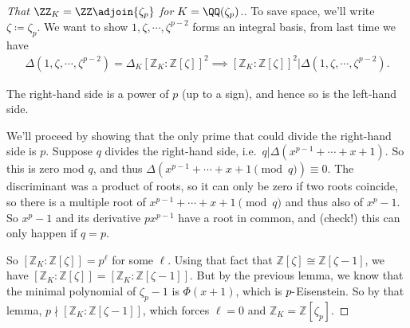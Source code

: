 \begin{proof}[That $\ZZ_K = \ZZ\adjoin{\zeta_p}$ for $K = \QQ(\zeta_p)$.]

To save space, we'll write \(\zeta \coloneqq\zeta_p\). We want to show
\(1, \zeta, \cdots, \zeta^{p-2}\) forms an integral basis, from last
time we have
\begin{align*}
{\Delta}( 1, \zeta, \cdots, \zeta^{p-2}) = 
{\Delta}_K 
[{\mathbb{Z}}_K : {\mathbb{Z}}[ \zeta ] ]^2 
\implies
[{\mathbb{Z}}_K : {\mathbb{Z}}[ \zeta ] ]^2 
\mathrel{\Big|}
{\Delta}( 1, \zeta, \cdots, \zeta^{p-2}) 
.\end{align*}

\begin{claim}

The right-hand side is a power of \(p\) (up to a sign), and hence so is
the left-hand side.

\end{claim}

We'll proceed by showing that the only prime that could divide the
right-hand side is \(p\). Suppose \(q\) divides the right-hand side,
i.e.~\(q \mathrel{\Big|}{\Delta}(x^{p-1} + \cdots + x + 1)\). So this is
zero mod \(q\), and thus
\({\Delta}( x^{p-1} + \cdots + x + 1 \pmod q) \equiv 0\). The
discriminant was a product of roots, so it can only be zero if two roots
coincide, so there is a multiple root of
\(x^{p-1} + \cdots + x + 1 \pmod q\) and thus also of \(x^p - 1\). So
\(x^p-1\) and its derivative \(px^{p-1}\) have a root in common, and
(check!) this can only happen if \(q=p\).

So \([{\mathbb{Z}}_K : {\mathbb{Z}}[\zeta] ] = p^\ell\) for some
\(\ell\). Using that fact that
\({\mathbb{Z}}[ \zeta] \cong {\mathbb{Z}}[ \zeta - 1]\), we have
\([ {\mathbb{Z}}_K : {\mathbb{Z}}[ \zeta] ] = [ {\mathbb{Z}}_K: {\mathbb{Z}}[\zeta - 1] ]\).
But by the previous lemma, we know that the minimal polynomial of
\(\zeta_p - 1\) is \(\Phi(x+1)\), which is \(p{\hbox{-}}\)Eisenstein. So
by that lemma, \(p\nmid[{\mathbb{Z}}_K: {\mathbb{Z}}[ \zeta - 1]]\),
which forces \(\ell = 0\) and
\({\mathbb{Z}}_K = {\mathbb{Z}}[ \zeta_p ]\).

\end{proof}

